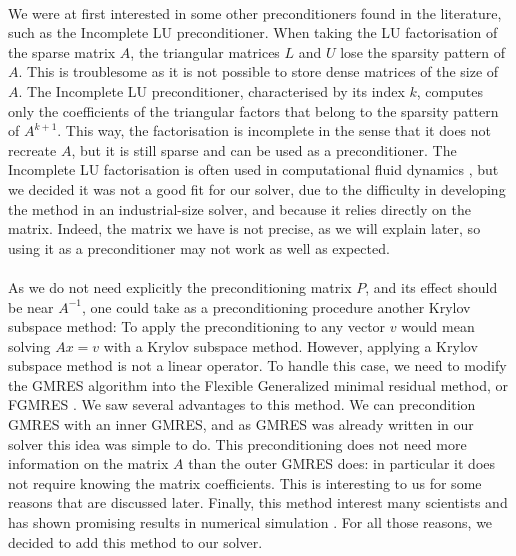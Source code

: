       \paragraph{}
      We were at first interested in some other preconditioners found in the literature, such as the Incomplete LU preconditioner.
      When taking the LU factorisation of the sparse matrix $A$, the triangular matrices $L$ and $U$ lose the sparsity pattern of $A$.
      This is troublesome as it is not possible to store dense matrices of the size of $A$.
      The Incomplete LU preconditioner, characterised by its index $k$, computes only the coefficients of the triangular factors that belong to the sparsity pattern of $A^{k+1}$.
      This way, the factorisation is incomplete in the sense that it does not recreate $A$, but it is still sparse and can be used as a preconditioner.
      The Incomplete LU factorisation is often used in computational fluid dynamics \cite{LiuZhangZhongEtAl2015, AhrabiMavriplis2020}, but we decided it was not a good fit for our solver, due to the difficulty in developing the method in an industrial-size solver, and because it relies directly on the matrix.
      Indeed, the matrix we have is not precise, as we will explain later, so using it as a preconditioner may not work as well as expected.

      \paragraph{}
      As we do not need explicitly the preconditioning matrix $P$, and its effect should be near $A^{-1}$, one could take as a preconditioning procedure another Krylov subspace method:
      To apply the preconditioning to any vector $v$ would mean solving $Ax = v$ with a Krylov subspace method.
      However, applying a Krylov subspace method is not a linear operator.
      To handle this case, we need to modify the GMRES algorithm into the Flexible Generalized minimal residual method, or FGMRES \cite{Saad1993, SimonciniSzyld2002}.
      We saw several advantages to this method.
      We can precondition GMRES with an inner GMRES, and as GMRES was already written in our solver this idea was simple to do.
      This preconditioning does not need more information on the matrix $A$ than the outer GMRES does: in particular it does not require knowing the matrix coefficients.
      This is interesting to us for some reasons that are discussed later.
      Finally, this method interest many scientists \cite{CoulaudGiraudRametEtAl2013, Vasseur2016} and has shown promising results in numerical simulation \cite{Pinel2010}.
      For all those reasons, we decided to add this method to our solver.

